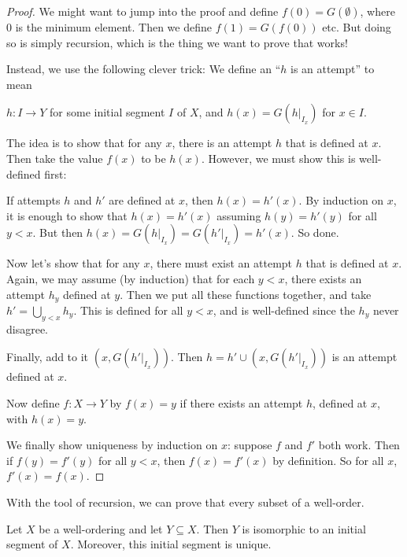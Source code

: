 \documentclass[a4paper]{article}
\begin{document}
\begin{proof}
  We might want to jump into the proof and define $f(0) = G(\emptyset)$, where $0$ is the minimum element. Then we define $f(1) = G(f(0))$ etc. But doing so is simply recursion, which is the thing we want to prove that works!

  Instead, we use the following clever trick: We define an ``$h$ is an attempt'' to mean
  \begin{center}
    $h: I \to Y$ for some initial segment $I$ of $X$, and $h(x) = G(h|_{I_x})$ for $x\in I$.
  \end{center}
  The idea is to show that for any $x$, there is an attempt $h$ that is defined at $x$. Then take the value $f(x)$ to be $h(x)$. However, we must show this is well-defined first:

  If attempts $h$ and $h'$ are defined at $x$, then $h(x) = h'(x)$. By induction on $x$, it is enough to show that $h(x) = h'(x)$ assuming $h(y) = h'(y)$ for all $y < x$. But then $h(x) = G(h|_{I_x}) = G(h'|_{I_x}) = h'(x)$. So done.

  Now let's show that for any $x$, there must exist an attempt $h$ that is defined at $x$. Again, we may assume (by induction) that for each $y < x$, there exists an attempt $h_y$ defined at $y$. Then we put all these functions together, and take $h' = \bigcup_{y < x} h_y$. This is defined for all $y < x$, and is well-defined since the $h_y$ never disagree.

  Finally, add to it $(x, G(h'|_{I_x}))$. Then $h = h'\cup (x, G(h'|_{I_x}))$ is an attempt defined at $x$.

  Now define $f:X\to Y$ by $f(x) = y$ if there exists an attempt $h$, defined at $x$, with $h(x) = y$.

  We finally show uniqueness by induction on $x$: suppose $f$ and $f'$ both work. Then if $f(y) = f'(y)$ for all $y < x$, then $f(x) = f'(x)$ by definition. So for all $x$, $f'(x) = f(x)$.
\end{proof}
With the tool of recursion, we can prove that every subset of a well-order.

\begin{lemma}
  Let $X$ be a well-ordering and let $Y\subseteq X$. Then $Y$ is isomorphic to an initial segment of $X$. Moreover, this initial segment is unique.
\end{lemma}
\end{document}

